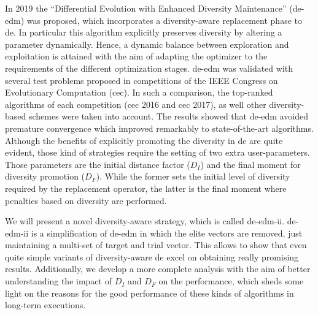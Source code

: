 \documentclass[a4paper,12pt]{article}
\newcommand{\DE}{{\sc de}}
\newcommand{\DEEDM}{{\sc de-edm}}
\newcommand{\DEEDMB}{{\sc de-edm-ii}}
\newcommand{\CEC}{{\sc cec}}
\newcommand{\CECA}{{\sc cec 2016}}
\newcommand{\CECB}{{\sc cec 2017}}
\begin{document}
In 2019 the ``Differential Evolution with Enhanced Diversity Maintenance'' (\DEEDM{}) was proposed, 
which incorporates a diversity-aware replacement phase to \DE{}.
%
In particular this algorithm explicitly preserves diversity by altering a parameter dynamically.
%
Hence, a dynamic balance between exploration and exploitation is attained with the aim of adapting the optimizer to 
the requirements of the different optimization stages.
%
\DEEDM{} was validated with several test problems proposed in competitions of the IEEE Congress on Evolutionary Computation (\CEC{}).
%
In such a comparison, the top-ranked algorithms of each competition (\CECA{} and \CECB{}), as well other diversity-based schemes 
were taken into account.
%
The results showed that \DEEDM{} avoided premature convergence which improved remarkably to state-of-the-art algorithms.
%
Although the benefits of explicitly promoting the diversity in \DE{} are quite evident, those kind of strategies require the 
setting of two extra user-parameters.
%
Those parameters are the initial distance factor ($D_I$) and the final moment for diversity promotion ($D_F$).
%
While the former sets the initial level of diversity required by the replacement operator,
the latter is the final moment where penalties based on diversity are performed.
%

%
%
We will present a novel diversity-aware strategy, which is called \DEEDMB{}.
%
\DEEDMB{} is a simplification of \DEEDM{} in which the elite vectors are removed, just maintaining a multi-set of target and trial vector.
%
This allows to show that even quite simple variants of diversity-aware \DE{} excel on obtaining really promising results.
%
Additionally, we develop a more complete analysis with the aim of better understanding the impact of $D_I$ and $D_F$ on the performance,
which sheds some light on the reasons for the good performance of these kinds of algorithms in
long-term executions.


% 
% 


\end{document}
